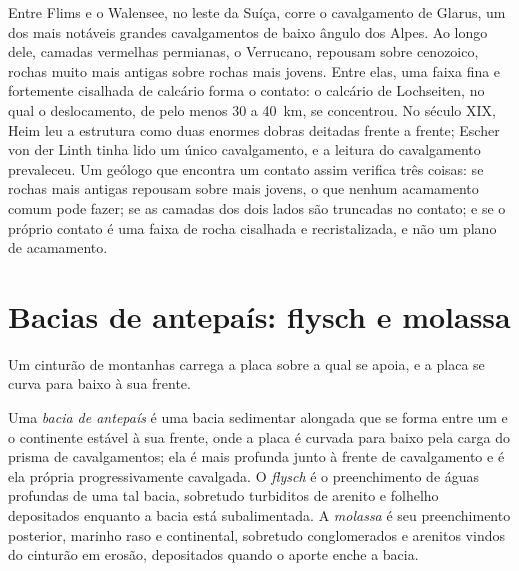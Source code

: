 \begin{inthefield}
Entre Flims e o Walensee, no leste da Suíça, corre o cavalgamento de Glarus, um dos
mais notáveis grandes cavalgamentos de baixo ângulo dos Alpes. Ao longo dele, camadas vermelhas permianas, o
Verrucano, repousam sobre  cenozoico, rochas muito mais antigas sobre rochas mais jovens. Entre elas, uma
faixa fina e fortemente cisalhada de calcário forma o contato: o calcário de Lochseiten, no qual o deslocamento, de pelo menos 30 a
\qty{40}{km}, se concentrou. No século XIX, Heim leu a estrutura como duas enormes
dobras deitadas frente a frente; Escher von der Linth tinha lido um único cavalgamento, e a leitura do cavalgamento prevaleceu. Um geólogo que encontra um contato assim verifica
três coisas: se rochas mais antigas repousam sobre mais jovens, o que nenhum acamamento comum pode fazer;
se as camadas dos dois lados são truncadas no contato; e se o próprio contato
é uma faixa de rocha cisalhada e recristalizada, e não um plano de acamamento.
\end{inthefield}

\section{Bacias de antepaís: flysch e molassa}\label{sec:b2:alpine-orogen:foreland}

Um cinturão de montanhas carrega a placa sobre a qual se apoia, e a placa se curva para baixo à sua frente.

\begin{definition}\label{def:b2:alpine-orogen:foreland}
Uma \emph{bacia de antepaís} é uma bacia sedimentar alongada que se forma
entre um  e o continente estável à sua frente, onde a placa é curvada para baixo pela
carga do prisma de cavalgamentos; ela é mais profunda junto à frente de cavalgamento e é ela própria
progressivamente cavalgada. O \emph{flysch} é o preenchimento de águas profundas de uma tal
bacia, sobretudo turbiditos de arenito e folhelho depositados enquanto a bacia está subalimentada.
A \emph{molassa} é seu preenchimento posterior, marinho raso e continental, sobretudo
conglomerados e arenitos vindos do cinturão em erosão, depositados quando o aporte enche a
bacia.
\end{definition}

